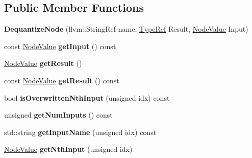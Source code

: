 \subsection*{Public Member Functions}
\begin{DoxyCompactItemize}
\item 
\mbox{\label{classglow_1_1_dequantize_node_aaba7662d3875f3ff544116e685bbf0f0}} 
{\bfseries Dequantize\+Node} (llvm\+::\+String\+Ref name, \hyperlink{structglow_1_1_type}{Type\+Ref} Result, \hyperlink{structglow_1_1_node_value}{Node\+Value} Input)
\item 
\mbox{\label{classglow_1_1_dequantize_node_a37b09b51d49dd42f8dd5d9a3d6ea61d9}} 
const \hyperlink{structglow_1_1_node_value}{Node\+Value} {\bfseries get\+Input} () const
\item 
\mbox{\label{classglow_1_1_dequantize_node_a227eccf9e55e6415091fd02cdfcdb405}} 
\hyperlink{structglow_1_1_node_value}{Node\+Value} {\bfseries get\+Result} ()
\item 
\mbox{\label{classglow_1_1_dequantize_node_a3bfd9812497ade4aaf1165b526ed17fc}} 
const \hyperlink{structglow_1_1_node_value}{Node\+Value} {\bfseries get\+Result} () const
\item 
\mbox{\label{classglow_1_1_dequantize_node_aed8f44e0cfa5f5643c55eac490492eae}} 
bool {\bfseries is\+Overwritten\+Nth\+Input} (unsigned idx) const
\item 
\mbox{\label{classglow_1_1_dequantize_node_a291bdddf89dd7bdeb370fea10014e063}} 
unsigned {\bfseries get\+Num\+Inputs} () const
\item 
\mbox{\label{classglow_1_1_dequantize_node_a758e941ec45d062ceccf86039899f108}} 
std\+::string {\bfseries get\+Input\+Name} (unsigned idx) const
\item 
\mbox{\label{classglow_1_1_dequantize_node_a96755f0f143fcd56d7d04e4a902703f0}} 
\hyperlink{structglow_1_1_node_value}{Node\+Value} {\bfseries get\+Nth\+Input} (unsigned idx)
\item 

\end{DoxyCompactItemize}

